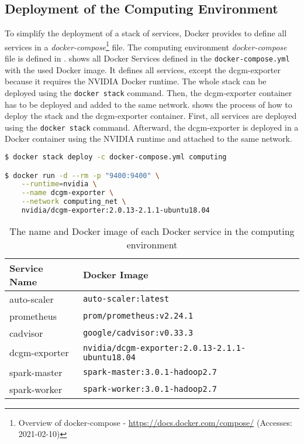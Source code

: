 \subsection{Deployment of the Computing Environment}
\label{subsec:06_env_depl} 
To simplify the deployment of a stack of services, Docker provides to define all services in a \textit{docker-compose}\footnote{Overview of docker-compose - \url{https://docs.docker.com/compose/} (Accesses: 2021-02-10)} file.
The computing environment \textit{docker-compose} file is defined in .
%
 shows all Docker Services defined in the \texttt{docker-compose.yml} with the used Docker image.
%
It defines all services, except the dcgm-exporter because it requires the NVIDIA Docker runtime.
%
The whole stack can be deployed using the \texttt{docker stack} command. Then, the dcgm-exporter container has to be deployed and added to the same network.
%
 shows the process of how to deploy the stack and the dcgm-exporter container. First, all services are deployed using the \texttt{docker stack} command. Afterward, the dcgm-exporter is deployed in a Docker container using the NVIDIA runtime and attached to the same network.
\begin{lstlisting}[label=lst:06_env_depl_docker-stack, caption=Commands to deploy the computing environment, language=sh, numbers=none]
$ docker stack deploy -c docker-compose.yml computing

$ docker run -d --rm -p "9400:9400" \
    --runtime=nvidia \
    --name dcgm-exporter \
    --network computing_net \
    nvidia/dcgm-exporter:2.0.13-2.1.1-ubuntu18.04
\end{lstlisting}
\begin{table}[]
\centering
\begin{tabular}{@{}ll@{}}
\toprule
Service Name  & Docker Image                                  \\ \midrule
auto-scaler   & \texttt{auto-scaler:latest}                            \\
prometheus    & \texttt{prom/prometheus:v2.24.1}                       \\
cadvisor      & \texttt{google/cadvisor:v0.33.3}                       \\
dcgm-exporter & \texttt{nvidia/dcgm-exporter:2.0.13-2.1.1-ubuntu18.04} \\
spark-master  & \texttt{spark-master:3.0.1-hadoop2.7}                  \\
spark-worker  & \texttt{spark-worker:3.0.1-hadoop2.7}                  \\ \bottomrule
\end{tabular}
\caption{The name and Docker image of each Docker service in the computing environment}
\label{table:06_env_depl_docker-stack}
\end{table}


